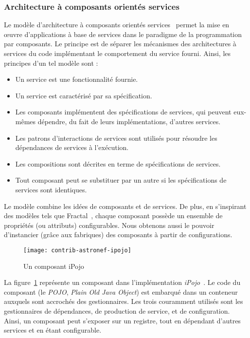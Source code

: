 \subsubsection{Architecture à composants orientés services}
Le modèle d'architecture à composants orientés services~\cite{Cervantes:servicecomponent} permet la mise en œuvre d'applications à base de services dans le paradigme de la programmation par composants. Le principe est de séparer les mécanismes des architectures à services du code implémentant le comportement du service fourni. Ainsi, les principes d'un tel modèle sont :
\begin{itemize}
    \item Un service est une fonctionnalité fournie.
    \item Un service est caractérisé par sa spécification.
    \item Les composants implémentent des spécifications de services, qui peuvent eux-mêmes dépendre, du fait de leurs implémentations, d'autres services.
    \item Les patrons d'interactions de services sont utilisés pour résoudre les dépendances de services à l'exécution.
    \item Les compositions sont décrites en terme de spécifications de services.
    \item Tout composant peut se substituer par un autre si les spécifications de services sont identiques.
\end{itemize}
Le modèle combine les idées de composants et de services. De plus, en s'inspirant des modèles tels que Fractal~\cite{Bruneton:fractal}, chaque composant possède un ensemble de propriétés (ou attributs) configurables. Nous obtenons aussi le pouvoir d'instancier (grâce aux fabriques) des composants à partir de configurations.

\begin{figure}[ht]
    \centering
    \texttt{[image: contrib-astronef-ipojo]}
    \caption{Un composant iPojo}\label{fig:contrib:astronef:ipojo}
\end{figure}
La figure~\ref{fig:contrib:astronef:ipojo} représente un composant dans l'implémentation \textit{iPojo}~\cite{Escoffier:ipojo}. Le code du composant (le \textit{POJO}, \textit{Plain Old Java Object}) est embarqué dans un conteneur auxquels sont accrochés des gestionnaires. Les trois couramment utilisés sont les gestionnaires de dépendances, de production de service, et de configuration. Ainsi, un composant peut s'exposer sur un registre, tout en dépendant d'autres services et en étant configurable.

